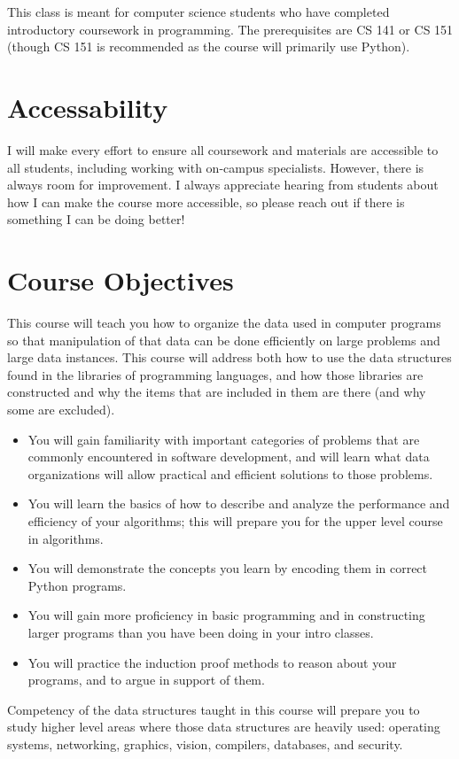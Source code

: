 \documentclass[11pt]{article}
\begin{document}
This class is meant for computer science students who have completed introductory coursework in programming. The prerequisites are CS 141 or CS 151 (though CS 151 is recommended as the course will primarily use Python).

\section*{Accessability}

I will make every effort to ensure all coursework and materials are accessible to all students, including working with on-campus specialists. However, there is always room for improvement. I always appreciate hearing from students about how I can make the course more accessible, so please reach out if there is something I can be doing better!


\section*{Course Objectives}
This course will teach you how to organize the data used in computer programs so that manipulation of that data can be done efficiently on large problems and large data instances.  This course will address both how to use the data structures found in the libraries of programming languages, and how those libraries are constructed and why the items that are included in them are there (and why some are excluded). 
\begin{itemize}
\item You will gain familiarity with important categories of problems that are commonly encountered in software development, and will learn what data organizations will allow practical and efficient solutions to those problems. 
\item You will learn the basics of how to describe and analyze the performance and efficiency of your algorithms; this will prepare you for the upper level course in algorithms. 
\item You will demonstrate the concepts you learn by encoding them in correct Python programs. 
\item You will gain more proficiency in basic programming and in constructing larger programs than you have been doing in your intro classes. 
\item You will practice the induction proof methods to reason about your programs, and to argue in support of them.  
\end{itemize}
Competency of the data structures taught in this course will prepare you to study higher level areas where those data structures are heavily used: operating systems, networking, graphics, vision, compilers, databases, and security.
\end{document}
